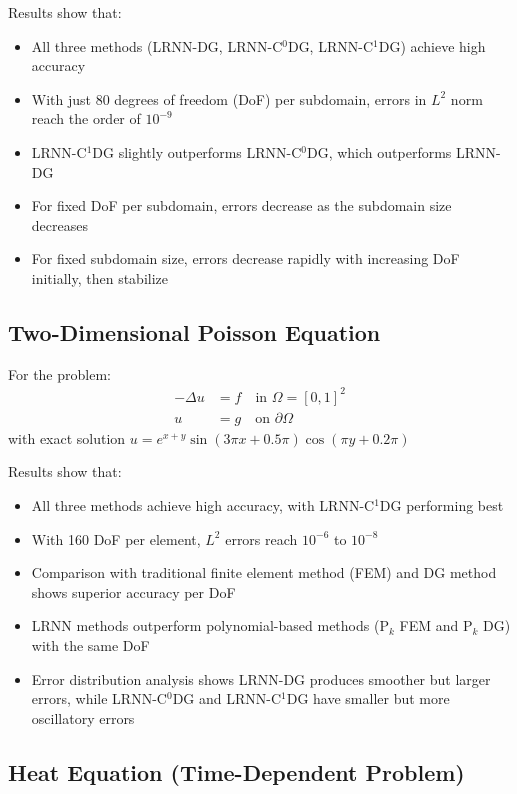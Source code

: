 \documentclass[11pt,a4paper]{article}
\begin{document}
Results show that:
\begin{itemize}
    \item All three methods (LRNN-DG, LRNN-C$^0$DG, LRNN-C$^1$DG) achieve high accuracy
    \item With just 80 degrees of freedom (DoF) per subdomain, errors in $L^2$ norm reach the order of $10^{-9}$
    \item LRNN-C$^1$DG slightly outperforms LRNN-C$^0$DG, which outperforms LRNN-DG
    \item For fixed DoF per subdomain, errors decrease as the subdomain size decreases
    \item For fixed subdomain size, errors decrease rapidly with increasing DoF initially, then stabilize
\end{itemize}

\subsection{Two-Dimensional Poisson Equation}

For the problem:
\begin{align}
-\Delta u &= f \quad \text{in } \Omega = [0,1]^2\\
u &= g \quad \text{on } \partial\Omega
\end{align}
with exact solution $u = e^{x+y}\sin(3\pi x + 0.5\pi)\cos(\pi y + 0.2\pi)$

Results show that:
\begin{itemize}
    \item All three methods achieve high accuracy, with LRNN-C$^1$DG performing best
    \item With 160 DoF per element, $L^2$ errors reach $10^{-6}$ to $10^{-8}$
    \item Comparison with traditional finite element method (FEM) and DG method shows superior accuracy per DoF
    \item LRNN methods outperform polynomial-based methods (P$_k$ FEM and P$_k$ DG) with the same DoF
    \item Error distribution analysis shows LRNN-DG produces smoother but larger errors, while LRNN-C$^0$DG and LRNN-C$^1$DG have smaller but more oscillatory errors
\end{itemize}

\subsection{Heat Equation (Time-Dependent Problem)}
\end{document}
